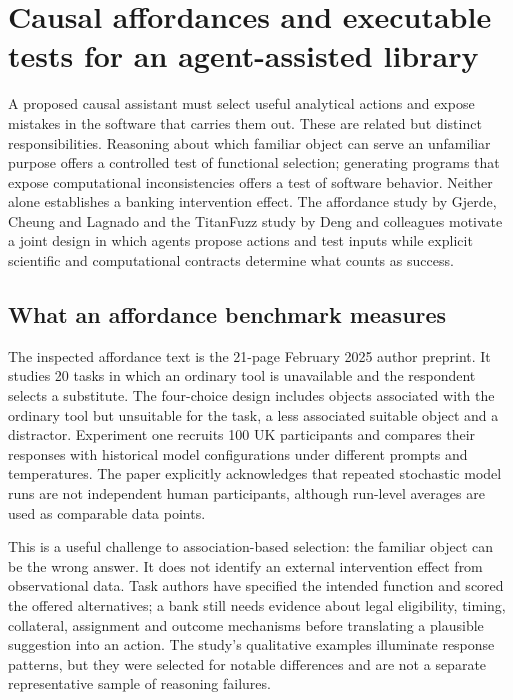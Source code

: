 \section{Causal affordances and executable tests for an agent-assisted library}
\label{sec:exec24-affordance-fuzzing}
A proposed causal assistant must select useful analytical actions and expose mistakes in the software that carries them out. These are related but distinct responsibilities. Reasoning about which familiar object can serve an unfamiliar purpose offers a controlled test of functional selection; generating programs that expose computational inconsistencies offers a test of software behavior. Neither alone establishes a banking intervention effect. The affordance study by Gjerde, Cheung and Lagnado and the TitanFuzz study by Deng and colleagues motivate a joint design in which agents propose actions and test inputs while explicit scientific and computational contracts determine what counts as success.~\citep{exec24_affordance_original,exec24_fuzzing_original,exec24_affordance_fuzzing_reference}

\subsection{What an affordance benchmark measures}
The inspected affordance text is the 21-page February 2025 author preprint. It studies 20 tasks in which an ordinary tool is unavailable and the respondent selects a substitute. The four-choice design includes objects associated with the ordinary tool but unsuitable for the task, a less associated suitable object and a distractor. Experiment one recruits 100 UK participants and compares their responses with historical model configurations under different prompts and temperatures. The paper explicitly acknowledges that repeated stochastic model runs are not independent human participants, although run-level averages are used as comparable data points.~\citep{exec24_affordance_original}

This is a useful challenge to association-based selection: the familiar object can be the wrong answer. It does not identify an external intervention effect from observational data. Task authors have specified the intended function and scored the offered alternatives; a bank still needs evidence about legal eligibility, timing, collateral, assignment and outcome mechanisms before translating a plausible suggestion into an action. The study's qualitative examples illuminate response patterns, but they were selected for notable differences and are not a separate representative sample of reasoning failures.~\citep{exec24_affordance_original,exec24_affordance_fuzzing_reference}

